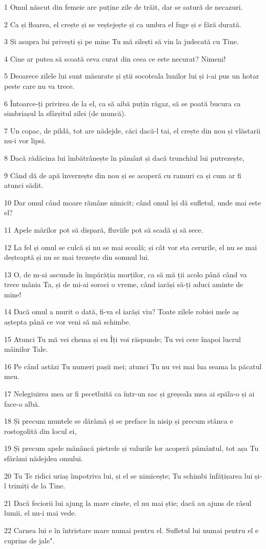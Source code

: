 \par 1 Omul născut din femeie are puține zile de trăit, dar se satură de necazuri.
\par 2 Ca și floarea, el crește și se veștejește și ca umbra el fuge și e fără durată.
\par 3 Și asupra lui privești și pe mine Tu mă silești să vin la judecată cu Tine.
\par 4 Cine ar putea să scoată ceva curat din ceea ce este necurat? Nimeni!
\par 5 Deoarece zilele lui sunt măsurate și știi socoteala lunilor lui și i-ai pus un hotar peste care nu va trece.
\par 6 Întoarce-ți privirea de la el, ca să aibă puțin răgaz, să se poată bucura ca simbriașul la sfârșitul zilei (de muncă).
\par 7 Un copac, de pildă, tot are nădejde, căci dacă-l tai, el crește din nou și vlăstarii nu-i vor lipsi.
\par 8 Dacă rădăcina lui îmbătrânește în pământ și dacă trunchiul lui putrezește,
\par 9 Când dă de apă înverzește din nou și se acoperă cu ramuri ca și cum ar fi atunci sădit.
\par 10 Dar omul când moare rămâne nimicit; când omul își dă sufletul, unde mai este el?
\par 11 Apele mărilor pot să dispară, fluviile pot să scadă și să sece.
\par 12 La fel și omul se culcă și nu se mai scoală; și cât vor sta cerurile, el nu se mai deșteaptă și nu se mai trezește din somnul lui.
\par 13 O, de m-ai ascunde în împărăția morților, ca să mă ții acolo până când va trece mânia Ta, și de mi-ai soroci o vreme, când iarăși să-ți aduci aminte de mine!
\par 14 Dacă omul a murit o dată, fi-va el iarăși viu? Toate zilele robiei mele aș aștepta până ce vor veni să mă schimbe.
\par 15 Atunci Tu mă vei chema și eu Îți voi răspunde; Tu vei cere înapoi lucrul mâinilor Tale.
\par 16 Pe când astăzi Tu numeri pașii mei; atunci Tu nu vei mai lua seama la păcatul meu.
\par 17 Nelegiuirea mea ar fi pecetluită ca într-un sac și greșeala mea ai spăla-o și ai face-o albă.
\par 18 Și precum muntele se dărâmă și se preface în nisip și precum stânca e rostogolită din locul ei,
\par 19 Și precum apele mănâncă pietrele și valurile lor acoperă pământul, tot așa Tu sfărâmi nădejdea omului.
\par 20 Tu Te ridici uriaș împotriva lui, și el se nimicește; Tu schimbi înfățișarea lui și-l trimiți de la Tine.
\par 21 Dacă feciorii lui ajung la mare cinste, el nu mai știe; dacă au ajuns de râsul lumii, el nu-i mai vede.
\par 22 Carnea lui e în întristare mare numai pentru el. Sufletul lui numai pentru el e cuprins de jale".

